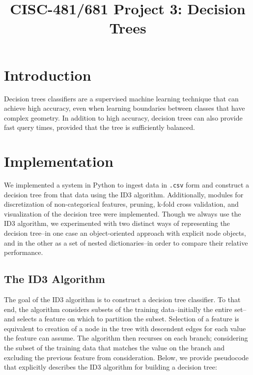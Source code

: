 \documentclass[12pt, conference, compsocconf]{IEEEtran}
\begin{document}
\title{CISC-481/681 Project 3: Decision Trees}

\author{
}

\maketitle

\section{Introduction}
Decision trees classifiers are a supervised machine learning technique that can achieve high accuracy, even when learning boundaries between classes that have complex geometry. 
In addition to high accuracy, decision trees can also provide fast query times, provided that the tree is sufficiently balanced. 

\section{Implementation}
We implemented a system in Python to ingest data in \texttt{.csv} form and construct a decision tree from that data using the ID3 algorithm.
Additionally, modules for discretization of non-categorical features, pruning, k-fold cross validation, and visualization of the decision tree were implemented.
Though we always use the ID3 algorithm, we experimented with two distinct ways of representing the decision tree--in one case an object-oriented approach with explicit node objects, and in the other as a set of nested dictionaries--in order to compare their relative performance.  

\subsection{The ID3 Algorithm}
The goal of the ID3 algorithm is to construct a decision tree classifier. 
To that end, the algorithm considers subsets of the training data--initially the entire set--and selects a feature on which to partition the subset. 
Selection of a feature is equivalent to creation of a node in the tree with descendent edges for each value the feature can assume.
The algorithm then recurses on each branch; considering the subset of the training data that matches the value on the branch and excluding the previous feature from consideration.
Below, we provide pseudocode that explicitly describes the ID3 algorithm for building a decision tree:
\end{document}
